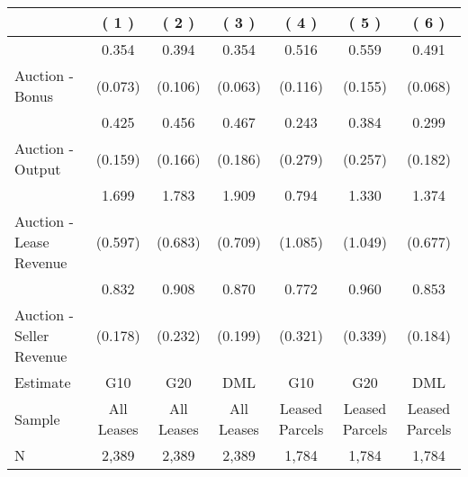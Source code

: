 
\begin{tabular}{lcccccc}
\toprule
  & ( 1 ) & ( 2 ) & ( 3 ) & ( 4 ) & ( 5 ) & ( 6 )\\
\midrule
 & 0.354 & 0.394 & 0.354 & 0.516 & 0.559 & 0.491\\

\multirow{-2}{*}{\raggedright\arraybackslash Auction - Bonus} & (0.073) & (0.106) & (0.063) & (0.116) & (0.155) & (0.068)\\

\midrule
 & 0.425 & 0.456 & 0.467 & 0.243 & 0.384 & 0.299\\

\multirow{-2}{*}{\raggedright\arraybackslash Auction - Output} & (0.159) & (0.166) & (0.186) & (0.279) & (0.257) & (0.182)\\

\midrule
 & 1.699 & 1.783 & 1.909 & 0.794 & 1.330 & 1.374\\

\multirow{-2}{*}{\raggedright\arraybackslash Auction - Lease Revenue} & (0.597) & (0.683) & (0.709) & (1.085) & (1.049) & (0.677)\\

\midrule
 & 0.832 & 0.908 & 0.870 & 0.772 & 0.960 & 0.853\\

\multirow{-2}{*}{\raggedright\arraybackslash Auction - Seller Revenue} & (0.178) & (0.232) & (0.199) & (0.321) & (0.339) & (0.184)\\

\midrule
Estimate & G10 & G20 & DML & G10 & G20 & DML\\

Sample & All Leases & All Leases & All Leases & Leased Parcels & Leased Parcels & Leased Parcels\\

N & 2,389 & 2,389 & 2,389 & 1,784 & 1,784 & 1,784\\
\bottomrule
\end{tabular}
